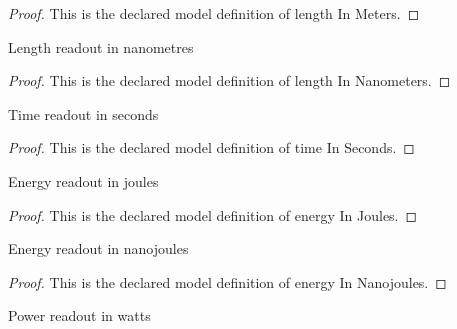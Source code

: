\begin{proof}
  This is the declared model definition of length In Meters.
\end{proof}
\begin{definition}
  \label{def:physics:phyx-mini-0588:phyxminiproblems-problemphyxmini0588-lengthinnanometers}
  Length readout in nanometres
\end{definition}
\begin{proof}
  This is the declared model definition of length In Nanometers.
\end{proof}
\begin{definition}
  \label{def:physics:phyx-mini-0588:phyxminiproblems-problemphyxmini0588-timeinseconds}
  Time readout in seconds
\end{definition}
\begin{proof}
  This is the declared model definition of time In Seconds.
\end{proof}
\begin{definition}
  \label{def:physics:phyx-mini-0588:phyxminiproblems-problemphyxmini0588-energyinjoules}
  Energy readout in joules
\end{definition}
\begin{proof}
  This is the declared model definition of energy In Joules.
\end{proof}
\begin{definition}
  \label{def:physics:phyx-mini-0588:phyxminiproblems-problemphyxmini0588-energyinnanojoules}
  Energy readout in nanojoules
\end{definition}
\begin{proof}
  This is the declared model definition of energy In Nanojoules.
\end{proof}
\begin{definition}
  \label{def:physics:phyx-mini-0588:phyxminiproblems-problemphyxmini0588-powerinwatts}
  Power readout in watts
\end{definition}
